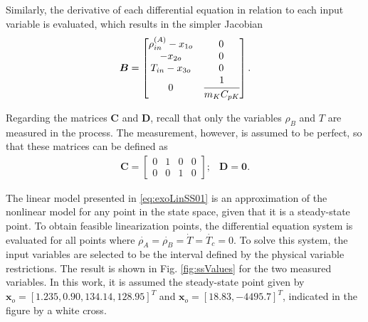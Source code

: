 \documentclass[a4paper,11pt]{book}
\numberwithin{figure}{chapter}
\numberwithin{equation}{chapter}
\numberwithin{table}{chapter}
\theoremstyle{definition}
\begin{document}
Similarly, the derivative of each differential equation in relation to each input variable is evaluated, which results in the simpler Jacobian
\begin{equation} \label{eq:exoLinSS02}
	\bm{B} = \begin{bmatrix}
		\rho^{(A)}_{in} - x_{1o} & 0 \\
		-x_{2o}			& 0 \\
		T_{in} - x_{3o}    & 0 \\
		0 			    & \cfrac{1}{m_K C_{pK}}
	\end{bmatrix}
.\end{equation} 

Regarding the matrices $\bm{C}$ and $\bm{D}$, recall that only the variables $\rho_B$ and $T$ are measured in the process. The measurement, however, is assumed to be perfect, so that these matrices can be defined as
\begin{equation} \label{eq:exoLinSS03}
\begin{matrix}
	\bm{C} = \begin{bmatrix}
		0 & 1 & 0 & 0 \\ 0 & 0 & 1 & 0
	\end{bmatrix}; & \bm{D} = \bm{0}.
\end{matrix}
\end{equation} 

The linear model presented in \eqref{eq:exoLinSS01} is an approximation of the nonlinear model for any point in the state space, given that it is a steady-state point. To obtain feasible linearization points, the differential equation system is evaluated for all points where $\dot{\rho_A} = \dot{\rho_B} =\dot{T} =\dot{T_c} = 0$. To solve this system, the input variables are selected to be the interval defined by the physical variable restrictions. The result is shown in Fig. \ref{fig:ssValues} for the two measured variables. In this work, it is assumed the steady-state point given by $\bm{x}_o = [1.235, 0.90, 134.14, 128.95]^T$ and $\bm{x}_o = [18.83, -4495.7]^T$, indicated in the figure by a white cross.
\end{document}
